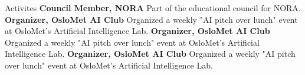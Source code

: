 \begin{rubric}{Activites}
\entry*[2019 -- 2020]%
\textbf{Council Member, NORA} Part of the educational council for NORA.
%
\entry*[2019 -- 2020]%
\textbf{Organizer, OsloMet AI Club} Organized a weekly "AI pitch over lunch" event at OsloMet's Artificial Intelligence Lab.
%
\entry*[2019 -- 2020]%
\textbf{Organizer, OsloMet AI Club} Organized a weekly "AI pitch over lunch" event at OsloMet's Artificial Intelligence Lab.
%
\entry*[2019 -- 2020]%
\textbf{Organizer, OsloMet AI Club} Organized a weekly "AI pitch over lunch" event at OsloMet's Artificial Intelligence Lab.
\end{rubric}